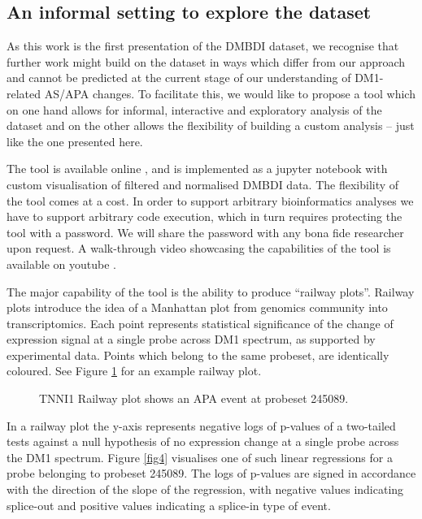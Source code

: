 \documentclass[10pt,letterpaper]{article}
\begin{document}
\subsection*{An informal setting to explore the dataset}

As this work is the first presentation of the DMBDI dataset, we recognise that further work might build on the dataset in ways which differ from our approach and cannot be predicted at the current stage of our understanding of DM1-related AS/APA changes. To facilitate this, we would like to propose a tool which on one hand allows for informal, interactive and exploratory analysis of the dataset and on the other allows the flexibility of building a custom analysis -- just like the one presented here.

The tool is available online \cite{Kurkiewicz2019}, and is implemented as a jupyter notebook with custom visualisation of filtered and normalised DMBDI data. The flexibility of the tool comes at a cost. In order to support arbitrary bioinformatics analyses we have to support arbitrary code execution, which in turn requires protecting the tool with a password. We will share the password with any bona fide researcher upon request. A walk-through video showcasing the capabilities of the tool is available on youtube \cite{Kurkiewicz2019_video}.

The major capability of the tool is the ability to produce ``railway plots''. Railway plots introduce the idea of a Manhattan plot from genomics community into transcriptomics. Each point represents statistical significance of the change of expression signal at a single probe across DM1 spectrum, as supported by experimental data. Points which belong to the same probeset, are identically coloured. See Figure \ref{fig2}  for an example railway plot.

\begin{figure}[!h]
\caption{TNNI1 Railway plot shows an APA event at probeset 245089.}
\label{fig2}
\end{figure}

In a railway plot the y-axis represents negative logs of p-values of a two-tailed tests against a null hypothesis of no expression change at a single probe across the DM1 spectrum. Figure \ref{fig4} visualises one of such linear regressions for a probe belonging to probeset 245089. The logs of p-values are signed in accordance with the direction of the slope of the regression, with negative values indicating splice-out and positive values indicating a splice-in type of event.
\end{document}

